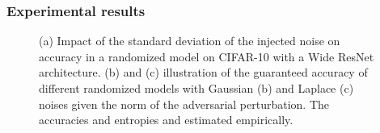 \subsubsection{Experimental results}



\begin{figure}[t]
\centering
{}
\caption{(a) Impact of the standard deviation of the injected noise on accuracy in a randomized model on CIFAR-10 with a Wide ResNet architecture. (b) and (c) illustration of the guaranteed accuracy of different randomized models with Gaussian (b) and Laplace (c) noises given the norm of the adversarial perturbation. The accuracies and entropies and estimated empirically. \label{fig:cifar10_results}
}
\end{figure}
